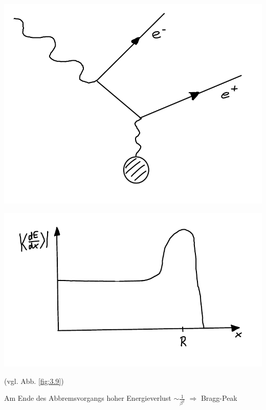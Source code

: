 \begin{minipage}[c]{.45\textwidth}
\captionsetup{type=figure}
\includegraphics[width=\textwidth]{imgs/ep5-fig-3-8.pdf}
\end{minipage}
\begin{minipage}[c]{.45\textwidth}
\captionsetup{type=figure}
\includegraphics[width=\textwidth]{imgs/ep5-fig-3-9.pdf}
\end{minipage}

 (vgl. Abb. \ref{fig:3.9})

Am Ende des Abbremsvorgangs hoher Energieverlust $\sim \frac{1}{\beta^2}$ $\Rightarrow$ \glqq Bragg-Peak\grqq{}

